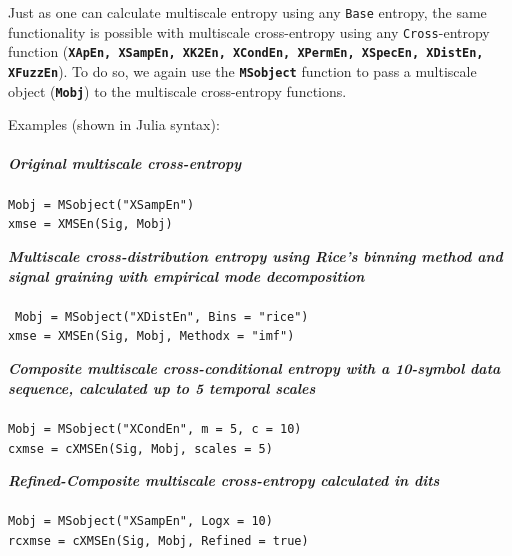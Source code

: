 \documentclass[12pt, a4paper, titlepage, openany]{book}
\begin{document}
Just as one can calculate multiscale entropy using any \texttt{Base} entropy, the same functionality is possible with multiscale cross-entropy using any \texttt{Cross}-entropy function (\texttt{\textbf{XApEn, XSampEn, XK2En, XCondEn, XPermEn, XSpecEn, XDistEn, XFuzzEn}}). To do so, we again use the \texttt{\textbf{MSobject}} function to pass a multiscale object (\texttt{\textbf{Mobj}}) to the multiscale cross-entropy functions.

\begin{center}
\end{center}
 
\noindent Examples (shown in Julia syntax)$\colon$ \footnotesize
\\ \ \\ \noindent \emph{\textbf{Original multiscale cross-entropy}} \cite{MS1}
\\ \ \\ \indent \texttt{Mobj = MSobject("XSampEn") \\
\indent xmse = XMSEn(Sig, Mobj)}

\noindent \emph{\textbf{Multiscale cross-distribution entropy using Rice's binning method and signal graining with empirical mode decomposition}} \cite{MS6} \cite{Dist1}\\
\\ \ \indent \texttt{Mobj = MSobject("XDistEn", Bins = "rice")\\
\indent xmse = XMSEn(Sig, Mobj, Methodx = "imf")}

\noindent \emph{\textbf{Composite multiscale cross-conditional entropy with a 10-symbol data sequence, calculated up to 5 temporal scales}} \cite{cMS1} \cite{Cond1}
\\ \ \\ \indent \texttt{Mobj = MSobject("XCondEn", m = 5, c = 10)\\
\indent cxmse = cXMSEn(Sig, Mobj, scales = 5)}

\noindent \emph{\textbf{Refined-Composite multiscale cross-entropy calculated in dits}} \cite{cMS2}
\\ \ \\ \indent \texttt{Mobj = MSobject("XSampEn", Logx = 10)\\
\indent rcxmse = cXMSEn(Sig, Mobj, Refined = true)}
\end{document}
